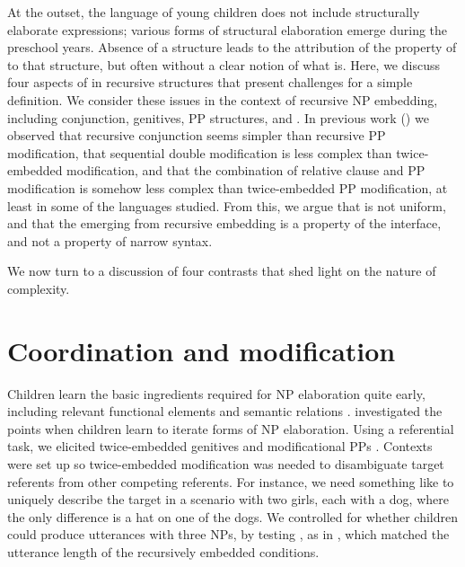 \documentclass[output=paper]{langsci/langscibook}
\begin{document}
At the outset, the language of young children does not include structurally
elaborate expressions; various forms of structural elaboration emerge during
the preschool years. Absence of a structure leads to the attribution of the
property of  to that structure, but often without a clear notion of
what  is. Here, we discuss four aspects of  in recursive
structures that present challenges for a simple definition. We consider these
issues in the context of recursive NP embedding, including conjunction,
genitives, PP structures, and . In previous work
(\citealt{Perez-LerouxEtAl2012,Perez-LerouxEtAl2018a,Perez-LerouxEtAl2018b}) we
observed that recursive conjunction seems simpler than recursive PP
modification, that sequential double modification is less complex than
twice-embedded modification, and that the combination of relative clause and PP
modification is somehow less complex than twice-embedded PP modification, at
least in some of the languages studied. From this, we argue that  is
not uniform, and that the  emerging from recursive embedding is a
property of the interface, and not a property of narrow syntax.

We now turn to a discussion of four contrasts that shed light on the nature of
complexity.

\section{Coordination and modification}

Children learn the basic ingredients required for NP elaboration quite early,
including relevant functional elements \citep{Brown1973} and semantic
relations \citep{BloomEtAl1975}. \citet{Perez-LerouxEtAl2012} investigated the
points when children learn to iterate forms of NP elaboration. Using a
referential task, we elicited twice-embedded genitives  and
modificational PPs . Contexts were set up so twice-embedded
modification was needed to disambiguate target referents from other competing
referents. For instance, we need something like  to uniquely
describe the target in a scenario with two girls, each with a dog, where the
only difference is a hat on one of the dogs.  We controlled for whether
children could produce utterances with three NPs, by testing
, as in , which matched the utterance length of
the recursively embedded conditions.
\end{document}
